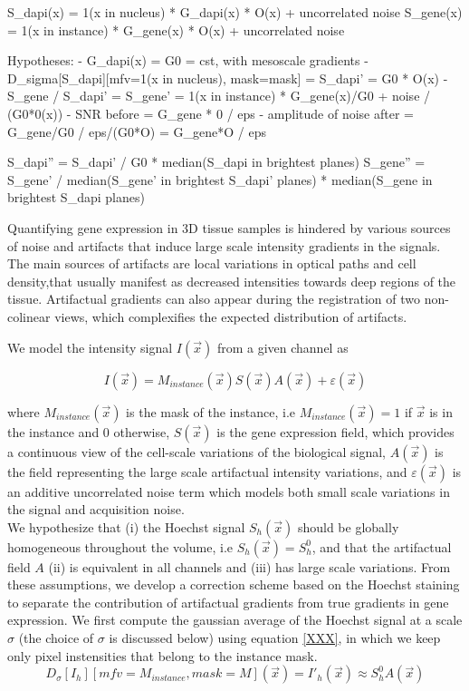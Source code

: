 S_dapi(x) = 1(x in nucleus) * G_dapi(x) * O(x) + uncorrelated noise
S_gene(x) = 1(x in instance) * G_gene(x) * O(x) + uncorrelated noise

Hypotheses:
    - G_dapi(x) = G0 = cst, with mesoscale gradients
    - D_sigma[S_dapi][mfv=1(x in nucleus), mask=mask] = S_dapi' =  G0 * O(x)
    - S_gene / S_dapi' = S_gene' = 1(x in instance) * G_gene(x)/G0 + noise / (G0*0(x))
    - SNR before = G_gene * 0 / eps
    - amplitude of noise after = G_gene/G0 / eps/(G0*O) = G_gene*O / eps

S_dapi'' = S_dapi' / G0 * median(S_dapi in brightest planes)
S_gene'' = S_gene' / median(S_gene' in brightest S_dapi' planes) * median(S_gene in brightest S_dapi planes)



Quantifying gene expression in 3D tissue samples is hindered by various sources of noise and artifacts that induce large scale intensity gradients in the signals.
The main sources of artifacts are local variations in optical paths and cell density,that usually manifest as decreased intensities towards deep regions of the tissue. 
Artifactual gradients can also appear during the registration of two non-colinear views, which complexifies the expected distribution of artifacts.

We model the intensity signal $I(\vec{x})$ from a given channel as

\begin{equation}
    I(\vec{x}) = M_{instance}(\vec{x}) S(\vec{x}) A(\vec{x}) + \varepsilon(\vec{x})
\end{equation}

where $M_{instance}(\vec{x})$ is the mask of the instance, i.e $M_{instance}(\vec{x}) = 1$ if $\vec{x}$ is in the instance and $0$ otherwise, $S(\vec{x})$ is the gene expression field, which provides a continuous view of the cell-scale variations of the biological signal, $A(\vec{x})$ is the field representing the large scale artifactual intensity variations, and $\varepsilon(\vec{x})$ is an additive uncorrelated noise term which models both small scale variations in the signal and acquisition noise.\\

We hypothesize that (i) the Hoechst signal $S_{h}(\vec{x})$ should be globally homogeneous throughout the volume, i.e $S_{h}(\vec{x}) = S_h^0$, and that the artifactual field $A$ (ii) is equivalent in all channels and (iii) has large scale variations.
From these assumptions, we develop a correction scheme based on the Hoechst staining to separate the contribution of artifactual gradients from true gradients in gene expression.
We first compute the gaussian average of the Hoechst signal at a scale $\sigma$ (the choice of $\sigma$ is discussed below) using equation \eqref{XXX}, in which we keep only pixel instensities that belong to the instance mask.
\begin{equation}
    D_{\sigma}[I_{h}][mfv=M_{instance}, mask=M](\vec{x}) = I'_{h}(\vec{x}) \approx S_h^0 A(\vec{x})
\end{equation}


